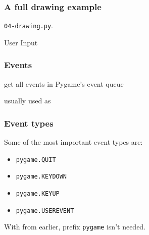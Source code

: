 \documentclass[handout]{beamer}   %
\begin{document}
\begin{frame}
\frametitle{A full drawing example}

\drawEx
\pause
\textcolor{tg}{\texttt{04-drawing.py}}.       
\end{frame}



\begin{frame}[plain]
\begin{center}
\Huge
User Input
\end{center}
\end{frame}


\begin{frame}
\frametitle{Events}
get all events in Pygame's event queue
\pyEvent
\pause
\bigskip
\medskip

usually used as

\bigskip
 
\forEvent

\end{frame}



\begin{frame}
\frametitle{Event types}

Some of the most important event types are:
\medskip
\begin{itemize}
\pause
\item[] \textcolor{tg}{\texttt{pygame.QUIT}} 
\pause
\item[] \textcolor{tg}{\texttt{pygame.KEYDOWN}}
\pause
\item[] \textcolor{tg}{\texttt{pygame.KEYUP}}
\pause
\item[] \textcolor{tg}{\texttt{pygame.USEREVENT}}
\pause
\end{itemize}
\bigskip
\medskip
\pause

With 
\importLocals
from earlier, prefix \textcolor{tg}{\texttt{pygame}} isn't needed.
\end{frame}
\end{document}
